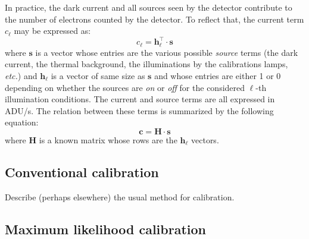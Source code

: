 \documentclass{aa}
\newcommand{\oops}[1]{\textcolor[named]{OrangeRed1}{#1}}
\newcommand*{\etc}{\emph{etc.}\xspace}
\newcommand*{\V}[1]{\boldsymbol{#1}}   %
\newcommand*{\M}[1]{\mathbf{#1}}       %
\newcommand*{\TransposeLetter}{\top}
\newcommand*{\T}{^{\TransposeLetter}}
\begin{document}
In practice, the dark current and all sources seen by the detector contribute
to the number of electrons counted by the detector.  To reflect that, the
current term $c_\ell$ may be expressed as:
\begin{equation}
  \label{eq:sources-to-current-term}
  c_\ell = \V h_\ell\T⋅\V s
\end{equation}
where $\V s$ is a vector whose entries are the various possible \emph{source}
terms (the dark current, the thermal background, the illuminations by the
calibrations lamps, \etc) and $\V h_\ell$ is a vector of same size as $\V s$
and whose entries are either 1 or 0 depending on whether the sources are
\emph{on} or \emph{off} for the considered $\ell$-th illumination conditions.
The current and source terms are all expressed in ADU/s.  The relation between
these terms is summarized by the following equation:
\begin{equation}
  \label{eq:sources-to-currents-model}
  \V c = \M H⋅\V s
\end{equation}
where $\M H$ is a known matrix whose rows are the $\V h_\ell$ vectors.


\subsection{Conventional calibration}

\oops{Describe (perhaps elsewhere) the usual method for calibration.}


\subsection{Maximum likelihood calibration}
\end{document}
